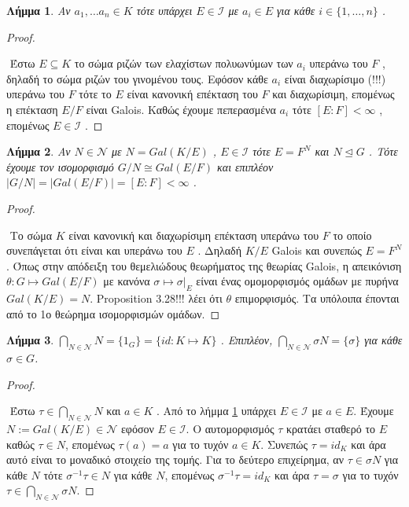 \documentclass[oneside,a4paper]{article}
\newtheorem{lemma}{Λήμμα}
\newcommand {\tl}{\textlatin}
\begin{document}
\begin{lemma} \label{17.1} Aν $a_1 , \ldots a_n \in K$ τότε υπάρχει $E \in \mathcal{I}$ με $a_i \in E$ για κάθε $i \in \{1,\dots, n\}$ .
\end{lemma}
\begin{proof} $ $%


$ $\newline
Έστω $E\subseteq K$ το σώμα ριζών των ελαχίστων πολυωνύμων των $a_i$ υπεράνω του $F$ , δηλαδή το σώμα ριζών του γινομένου τους. Εφόσον κάθε $a_i$ είναι διαχωρίσιμο (!!!) υπεράνω του $F$ τότε το $E$ είναι κανονική επέκταση του $F$ και διαχωρίσιμη, επομένως η επέκταση $E/F$ είναι \tl{Galois}. Καθώς έχουμε πεπερασμένα $a_i$ τότε $[E:F]< \infty$ , επομένως $E \in \mathcal{I}$ .

\end{proof}

\begin{lemma} \label{17.2} Αν $N \in \mathcal{N}$ με $N = Gal(K/E)$ , $E \in \mathcal{I}$ τότε $E=F^N$ και $N\unlhd G$ . Τότε έχουμε τον ισομορφισμό $G/N \cong Gal(E/F)$ και επιπλέον $|G/N| = |Gal(E/F)| = [E:F] < \infty$ .
\end{lemma}  
\begin{proof} $ $
 
$ $\newline
Το σώμα $K$ είναι κανονική και διαχωρίσιμη επέκταση υπεράνω του $F$ το οποίο συνεπάγεται ότι είναι και υπεράνω του $E$ . Δηλαδή $K/E$ \tl{Galois} και συνεπώς $E = F^N$. Όπως στην απόδειξη του θεμελιώδους θεωρήματος της θεωρίας \tl{Galois}, η απεικόνιση $\theta : G \mapsto Gal(E/F)$ με κανόνα $\sigma \mapsto \sigma|_E$ είναι ένας ομομορφισμός ομάδων με πυρήνα $Gal(K/E) = N$. Proposition 3.28!!! λέει ότι $\theta$ επιμορφισμός. Τα υπόλοιπα έπονται από το 1ο θεώρημα ισομορφισμών ομάδων.
\end{proof}

\begin{lemma} \label{17.3}  $\bigcap_{N \in \mathcal{N}} N= \{1_G \} = \{ id: K \mapsto K \}$ . Επιπλέον, $\bigcap_{N \in \mathcal{N}} \sigma N = \{\sigma \}$ για κάθε $\sigma \in G$.
\end{lemma}
\begin{proof} $ $

$ $\newline	
Έστω $\tau \in \bigcap_{N \in \mathcal{N}} N$ και $a \in K$ . Από το λήμμα \ref{17.1} υπάρχει  $E \in \mathcal{I}$ με $a \in E$. Έχουμε $N := Gal(K/E) \in \mathcal{N}$ εφόσον $E \in \mathcal{I}$. Ο αυτομορφισμός $\tau$ κρατάει σταθερό το $E$ καθώς $\tau \in N$, επομένως $\tau (a) = a$ για το τυχόν $a \in K$. Συνεπώς $\tau = id_K$ και άρα αυτό είναι το μοναδικό στοιχείο της τομής. Για το δεύτερο επιχείρημα, αν $\tau \in \sigma N$ για κάθε $N$ τότε $\sigma^{-1} \tau \in N$ για κάθε $N$, επομένως $\sigma^{-1} \tau = id_K$ και άρα $\tau = \sigma$ για το τυχόν $\tau \in \bigcap_{N \in \mathcal{N}} \sigma N$.
\end{proof}
\end{document}

